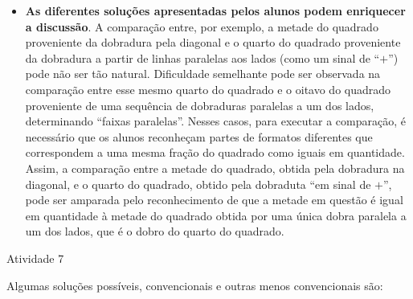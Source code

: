 \begin{multicols}{2}
\begin{itemize}
    \item \textbf{As diferentes soluções apresentadas pelos alunos podem enriquecer a discussão}. A comparação entre, por exemplo, a metade do quadrado proveniente da dobradura pela diagonal e o quarto do quadrado proveniente da dobradura a partir de linhas paralelas aos lados (como um sinal de       ``$+$'') pode não ser tão natural. Dificuldade semelhante pode ser observada na comparação entre esse mesmo quarto do quadrado e o oitavo do quadrado proveniente de uma sequência de dobraduras paralelas a um dos lados, determinando       ``faixas paralelas''. Nesses casos, para executar a comparação, é necessário que os alunos reconheçam partes de formatos diferentes que correspondem a uma mesma fração do quadrado como iguais em quantidade. Assim, a comparação entre a metade do quadrado, obtida pela dobradura na diagonal, e o quarto do quadrado, obtido pela dobraduta       ``em sinal de $+$'', pode ser amparada pelo reconhecimento de que a metade em questão é igual em quantidade à metade do quadrado obtida por uma única dobra paralela a um dos lados, que é o dobro do quarto do quadrado.
\end{itemize} %

\begin{resposta*}{Atividade 7}

  Algumas soluções possíveis, convencionais e outras menos convencionais são:


\end{resposta*}
\end{multicols}
